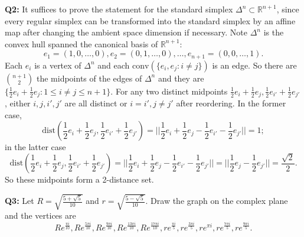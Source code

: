 \documentclass[12pt,reqno]{amsart}
\theoremstyle{definition}
\newcommand{\RR}{\mathbb{R}}
\newcommand{\conv}[1]{\mathrm{conv}(#1)}
\begin{document}
\begin{center}
\end{center}


\newpage
\noindent \textbf{Q2:} It suffices to prove the statement for the standard simplex $\Delta^n\subset \RR^{n+1}$, since every regular simplex can be transformed into the standard simplex by an affine map after changing the ambient space dimension if necessary. Note $\Delta^n$ is the convex hull spanned the canonical basis of $\RR^{n+1}$:$$e_1=(1,0,\dots,0), e_2=(0,1,\dots,0),\dots, e_{n+1} = (0,0,\dots,1).$$ Each $e_i$ is a vertex of $\Delta^n$ and each $\conv{\{e_i,e_j:i\not=j\}}$ is an edge. So there are $\binom{n+1}{2}$ the midpoints of the edges of $\Delta^n$ and they are $\{\frac{1}{2}e_i+\frac{1}{2}e_j:  1\leq i\not=j \leq n+1\}$. For any two distinct midpoints $\frac{1}{2}e_i+\frac{1}{2}e_j, \frac{1}{2}e_{i'}+\frac{1}{2}e_{j'}$, either $i,j,i',j'$ are all distinct or $i=i', j\not=j'$ after reordering. In the former case,  $$\mathrm{dist}( \frac{1}{2}e_i+\frac{1}{2}e_j, \frac{1}{2}e_{i'}+\frac{1}{2}e_{j'} ) = ||\frac{1}{2}e_i+\frac{1}{2}e_j - \frac{1}{2}e_{i'}-\frac{1}{2}e_{j'}||= 1;$$
in the latter case $$\mathrm{dist}( \frac{1}{2}e_i+\frac{1}{2}e_j, \frac{1}{2}e_{i'}+\frac{1}{2}e_{j'} ) = ||\frac{1}{2}e_i+\frac{1}{2}e_j - \frac{1}{2}e_{i'}-\frac{1}{2}e_{j'}|| =||\frac{1}{2}e_j -\frac{1}{2}e_{j'}||  = \frac{\sqrt{2}}{2}.$$
So these midpoints form a 2-distance set.



\newpage
\noindent \textbf{Q3:} Let $R=\sqrt{\frac{5+\sqrt{5}}{10}}$ and $r=\sqrt{\frac{5-\sqrt{5}}{10}}$. Draw the graph on the complex plane and the vertices are $$Re^{\frac{\pi i}{10}},Re^{\frac{5\pi i}{10}},Re^{\frac{9\pi i}{10}},Re^{\frac{13 \pi i}{10}},Re^{\frac{17\pi i}{10}}, re^{\frac{\pi i}{5}}, re^{\frac{3\pi i}{5}},  re^{\pi i},  re^{\frac{7\pi i}{5}}, re^{\frac{9\pi i}{5}}.$$
\begin{center}
\end{center}
\end{document}
